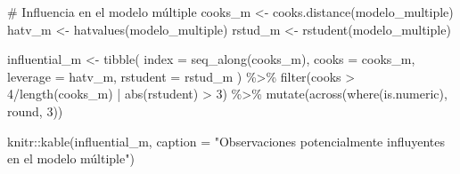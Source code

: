 \documentclass[
  spanish,
  11pt,
  a4paper,
  DIV=11,
  numbers=noendperiod]{scrartcl}
\newenvironment{Shaded}{\begin{snugshade}}{\end{snugshade}}
\newcommand{\AttributeTok}[1]{\textcolor[rgb]{0.40,0.45,0.13}{#1}}
\newcommand{\CommentTok}[1]{\textcolor[rgb]{0.37,0.37,0.37}{#1}}
\newcommand{\DecValTok}[1]{\textcolor[rgb]{0.68,0.00,0.00}{#1}}
\newcommand{\FunctionTok}[1]{\textcolor[rgb]{0.28,0.35,0.67}{#1}}
\newcommand{\NormalTok}[1]{\textcolor[rgb]{0.00,0.23,0.31}{#1}}
\newcommand{\OtherTok}[1]{\textcolor[rgb]{0.00,0.23,0.31}{#1}}
\newcommand{\SpecialCharTok}[1]{\textcolor[rgb]{0.37,0.37,0.37}{#1}}
\newcommand{\StringTok}[1]{\textcolor[rgb]{0.13,0.47,0.30}{#1}}
\begin{document}
\begin{Shaded}
\begin{Highlighting}[numbers=left,,]
\CommentTok{\# Influencia en el modelo múltiple}
\NormalTok{cooks\_m }\OtherTok{\textless{}{-}} \FunctionTok{cooks.distance}\NormalTok{(modelo\_multiple)}
\NormalTok{hatv\_m  }\OtherTok{\textless{}{-}} \FunctionTok{hatvalues}\NormalTok{(modelo\_multiple)}
\NormalTok{rstud\_m }\OtherTok{\textless{}{-}} \FunctionTok{rstudent}\NormalTok{(modelo\_multiple)}

\NormalTok{influential\_m }\OtherTok{\textless{}{-}} \FunctionTok{tibble}\NormalTok{(}
  \AttributeTok{index =} \FunctionTok{seq\_along}\NormalTok{(cooks\_m),}
  \AttributeTok{cooks =}\NormalTok{ cooks\_m,}
  \AttributeTok{leverage =}\NormalTok{ hatv\_m,}
  \AttributeTok{rstudent =}\NormalTok{ rstud\_m}
\NormalTok{) }\SpecialCharTok{\%\textgreater{}\%}
  \FunctionTok{filter}\NormalTok{(cooks }\SpecialCharTok{\textgreater{}} \DecValTok{4}\SpecialCharTok{/}\FunctionTok{length}\NormalTok{(cooks\_m) }\SpecialCharTok{|} \FunctionTok{abs}\NormalTok{(rstudent) }\SpecialCharTok{\textgreater{}} \DecValTok{3}\NormalTok{) }\SpecialCharTok{\%\textgreater{}\%}
  \FunctionTok{mutate}\NormalTok{(}\FunctionTok{across}\NormalTok{(}\FunctionTok{where}\NormalTok{(is.numeric), round, }\DecValTok{3}\NormalTok{))}

\NormalTok{knitr}\SpecialCharTok{::}\FunctionTok{kable}\NormalTok{(influential\_m,}
             \AttributeTok{caption =} \StringTok{"Observaciones potencialmente }
\StringTok{             influyentes en el modelo múltiple"}\NormalTok{)}
\end{Highlighting}
\end{Shaded}
\end{document}
